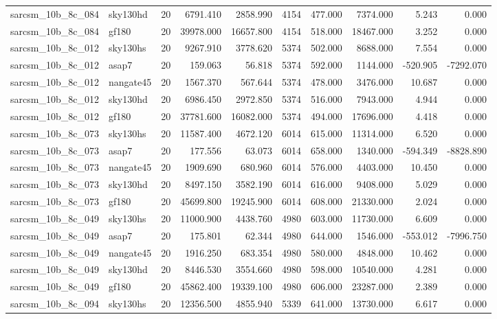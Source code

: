 \begin{longtable}{llrrrrrrrr}
sarcsm\_10b\_8c\_084 & sky130hd & 20 & 6791.410 & 2858.990 & 4154 & 477.000 & 7374.000 & 5.243 & 0.000 \\
sarcsm\_10b\_8c\_084 & gf180 & 20 & 39978.000 & 16657.800 & 4154 & 518.000 & 18467.000 & 3.252 & 0.000 \\
sarcsm\_10b\_8c\_012 & sky130hs & 20 & 9267.910 & 3778.620 & 5374 & 502.000 & 8688.000 & 7.554 & 0.000 \\
sarcsm\_10b\_8c\_012 & asap7 & 20 & 159.063 & 56.818 & 5374 & 592.000 & 1144.000 & -520.905 & -7292.070 \\
sarcsm\_10b\_8c\_012 & nangate45 & 20 & 1567.370 & 567.644 & 5374 & 478.000 & 3476.000 & 10.687 & 0.000 \\
sarcsm\_10b\_8c\_012 & sky130hd & 20 & 6986.450 & 2972.850 & 5374 & 516.000 & 7943.000 & 4.944 & 0.000 \\
sarcsm\_10b\_8c\_012 & gf180 & 20 & 37781.600 & 16082.000 & 5374 & 494.000 & 17696.000 & 4.418 & 0.000 \\
sarcsm\_10b\_8c\_073 & sky130hs & 20 & 11587.400 & 4672.120 & 6014 & 615.000 & 11314.000 & 6.520 & 0.000 \\
sarcsm\_10b\_8c\_073 & asap7 & 20 & 177.556 & 63.073 & 6014 & 658.000 & 1340.000 & -594.349 & -8828.890 \\
sarcsm\_10b\_8c\_073 & nangate45 & 20 & 1909.690 & 680.960 & 6014 & 576.000 & 4403.000 & 10.450 & 0.000 \\
sarcsm\_10b\_8c\_073 & sky130hd & 20 & 8497.150 & 3582.190 & 6014 & 616.000 & 9408.000 & 5.029 & 0.000 \\
sarcsm\_10b\_8c\_073 & gf180 & 20 & 45699.800 & 19245.900 & 6014 & 608.000 & 21330.000 & 2.024 & 0.000 \\
sarcsm\_10b\_8c\_049 & sky130hs & 20 & 11000.900 & 4438.760 & 4980 & 603.000 & 11730.000 & 6.609 & 0.000 \\
sarcsm\_10b\_8c\_049 & asap7 & 20 & 175.801 & 62.344 & 4980 & 644.000 & 1546.000 & -553.012 & -7996.750 \\
sarcsm\_10b\_8c\_049 & nangate45 & 20 & 1916.250 & 683.354 & 4980 & 580.000 & 4848.000 & 10.462 & 0.000 \\
sarcsm\_10b\_8c\_049 & sky130hd & 20 & 8446.530 & 3554.660 & 4980 & 598.000 & 10540.000 & 4.281 & 0.000 \\
sarcsm\_10b\_8c\_049 & gf180 & 20 & 45862.400 & 19339.100 & 4980 & 606.000 & 23287.000 & 2.389 & 0.000 \\
sarcsm\_10b\_8c\_094 & sky130hs & 20 & 12356.500 & 4855.940 & 5339 & 641.000 & 13730.000 & 6.617 & 0.000 \\

\end{longtable}
